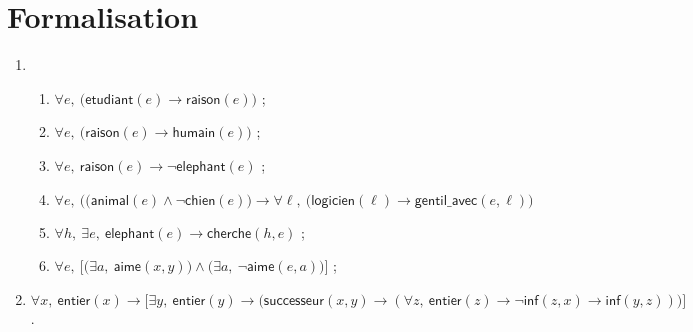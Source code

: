 \section{Formalisation}

\begin{enumerate}
	\item
		\begin{enumerate}[label=(\arabic*)]
			\item $\forall e,\:\big(\textsf{etudiant}(e) \to \textsf{raison}(e)\big)$ ;
			\item $\forall e,\:\big(\textsf{raison}(e) \to \textsf{humain}(e)\big)$ ;
			\item $\forall e,\: \textsf{raison}(e) \to \lnot \textsf{elephant}(e)$ ;
			\item $\forall e,\: \big(\big(\textsf{animal}(e) \land\lnot \textsf{chien}(e)\big)\to \forall \ell,\:\big(\textsf{logicien}(\ell) \to \textsf{gentil\_avec}(e, \ell)\big)$\/
			\item $\forall h,\:\exists e,\: \textsf{elephant}(e) \to \textsf{cherche}(h, e)$\/ ;
			\item $\forall e,\:\big[\big(\exists a,\: \textsf{aime}(x,y)\big) \land \big(\exists a,\: \lnot \textsf{aime}(e,a)\big)\big]$ ;
		\end{enumerate}
	\item $\forall x,\: \textsf{entier}(x) \to\big[\exists y,\:\textsf{entier}(y) \to \big(\textsf{successeur}(x,y) \to  (\forall z,\: \textsf{entier}(z) \to \lnot \textsf{inf}(z,x) \to \textsf{inf}(y, z))\big)\big]$.
\end{enumerate}
